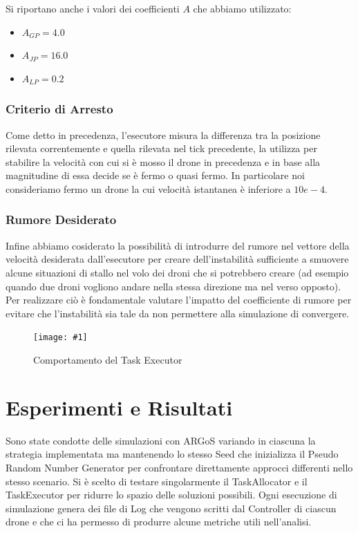 \documentclass[a4paper,11pt,oneside, table]{article}
\newcommand{\putimage}[4] {
	\begin{figure}[H]
	    \centering
	    \texttt{[image: \#1]}
	    \caption{#2}\label{#3}
	\end{figure}
}
\begin{document}
Si riportano anche i valori dei coefficienti $A$ che abbiamo utilizzato:

\begin{itemize}
  \item $A_{GP} = 4.0$
  \item $A_{JP} = 16.0$
  \item $A_{LP} = 0.2$
\end{itemize}

\subsubsection{Criterio di Arresto}
Come detto in precedenza, l'esecutore misura la differenza tra la posizione rilevata correntemente e quella rilevata nel tick precedente, la utilizza per stabilire la velocit\`a con cui si \`e mosso il drone in precedenza e in base alla magnitudine di essa decide se \`e fermo o quasi fermo.
In particolare noi consideriamo fermo un drone la cui velocit\`a istantanea \`e inferiore a $10e-4$.

\subsubsection{Rumore Desiderato}
Infine abbiamo cosiderato la possibilit\`a di introdurre del rumore nel vettore della velocit\`a desiderata dall'esecutore per creare dell'instabilit\`a sufficiente a smuovere alcune situazioni di stallo nel volo dei droni che si potrebbero creare (ad esempio quando due droni vogliono andare nella stessa direzione ma nel verso opposto).
Per realizzare ci\`o \`e fondamentale valutare l'impatto del coefficiente di rumore per evitare che l'instabilit\`a sia tale da non permettere alla simulazione di convergere.

\putimage{images/task-executor.png}{Comportamento del Task Executor}{png:task-executor}{0.99}

\section{Esperimenti e Risultati}

Sono state condotte delle simulazioni con ARGoS variando in ciascuna la strategia implementata ma mantenendo lo stesso Seed che inizializza il Pseudo Random Number Generator per confrontare direttamente approcci differenti nello stesso scenario.
Si \`e scelto di testare singolarmente il TaskAllocator e il TaskExecutor per ridurre lo spazio delle soluzioni possibili.
Ogni esecuzione di simulazione genera dei file di Log che vengono scritti dal Controller di ciascun drone e che ci ha permesso di produrre alcune metriche utili nell'analisi.
\end{document}
